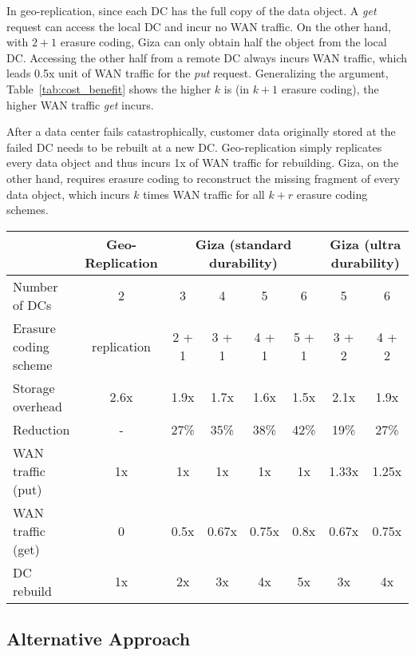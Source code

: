 In geo-replication, since each DC has the full copy of the data object. A {\em get} request can access the local DC and incur no WAN traffic. On the other hand, with $2+1$ erasure coding, Giza can only obtain half the object from the local DC. Accessing the other half from a remote DC always incurs WAN traffic, which leads 0.5x unit of WAN traffic for the {\em put} request. Generalizing the argument, Table~\ref{tab:cost_benefit} shows the higher $k$ is (in $k+1$ erasure coding), the higher WAN traffic {\em get} incurs.

After a data center fails catastrophically, customer data originally stored at the failed DC needs to be rebuilt at a new DC. Geo-replication simply replicates every data object and thus incurs 1x of WAN traffic for rebuilding. Giza, on the other hand, requires erasure coding to reconstruct the missing fragment of every data object, which incurs $k$ times WAN traffic for all $k+r$ erasure coding schemes.

\begin{table*}[thp]
\centering
\begin{tabular}{|l||c||c|c|c|c||c|c|}
\hline
				& Geo-Replication    	& \multicolumn{4}{c||}{Giza (standard durability)}		& \multicolumn{2}{c|}{Giza (ultra durability)}
\\ \hline \hline
Number of DCs 				& 2										& 3 & 4 & 5 & 6									& 5 & 6
\\ \hline
Erasure coding scheme & replication					& 2 + 1 & 3 + 1 & 4 + 1 & 5 + 1	& 3 + 2 & 4 + 2
\\ \hline \hline
Storage overhead			& 2.6x								& 1.9x & 1.7x & 1.6x & 1.5x			& 2.1x & 1.9x
\\ \hline
Reduction							& -										& 27\% & 35\% & 38\% & 42\%			& 19\% & 27\%
\\ \hline \hline
WAN traffic (put)			& 1x									& 1x & 1x & 1x & 1x 						& 1.33x & 1.25x
\\ \hline
WAN traffic (get)			& 0										& 0.5x & 0.67x & 0.75x & 0.8x		& 0.67x & 0.75x
\\ \hline
DC rebuild 						& 1x									& 2x & 3x & 4x & 5x 						& 3x & 4x
\\ \hline \hline
\end{tabular}
\caption{Trade-off of storage, bandwidth and durability.}
\label{tab:cost_benefit}
\end{table*}

\subsection{Alternative Approach}
\label{sec:alternative}

